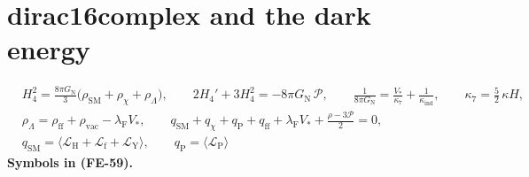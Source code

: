\documentclass[
  10pt,
]{article}
\begin{document}
\hypertarget{dirac16complex-and-the-dark-energy}{%
\section{dirac16complex and the dark
energy}\label{dirac16complex-and-the-dark-energy}}

\[
\begin{aligned}
&H_4^2 = \frac{8\pi G_{\mathrm{N}}}{3}\big(\rho_{\mathrm{SM}} + \rho_\chi + \rho_\Lambda\big),\qquad
 2H_4' + 3H_4^2 = -8\pi G_{\mathrm{N}}\,\mathcal{P},\qquad
 \frac{1}{8\pi G_{\mathrm{N}}} = \frac{V_*}{\kappa_7} + \frac{1}{\kappa_{\mathrm{ind}}},\qquad \kappa_7 = \frac52\,\kappa H,\\
&\rho_\Lambda = \rho_{\mathrm{ff}} + \rho_{\mathrm{vac}} - \lambda_{\mathrm{F}}V_*,\qquad
 q_{\mathrm{SM}} + q_\chi + q_{\mathrm{P}} + q_{\mathrm{ff}} + \lambda_{\mathrm{F}}V_* + \frac{\rho - 3\mathcal{P}}{2} = 0,\\
&q_{\mathrm{SM}} = \big\langle\mathcal{L}_{\mathrm{H}} + \mathcal{L}_{\mathrm{f}} + \mathcal{L}_{\mathrm{Y}}\big\rangle,\qquad
 q_{\mathrm{P}} = \langle\mathcal{L}_{\mathrm{P}}\rangle
\end{aligned} \tag{FE-59}
\] \textbf{Symbols in (FE-59).}
\end{document}
